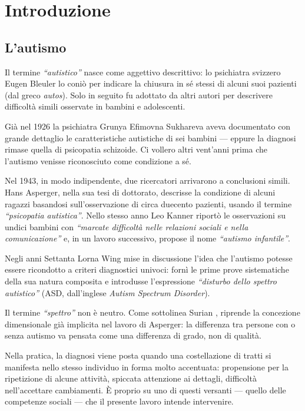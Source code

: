 \documentclass[12pt]{report}
\begin{document}
\chapter{Introduzione}
\label{cap:introduzione}

\section{L'autismo}
Il termine \textit{``autistico''} nasce come aggettivo descrittivo: lo psichiatra svizzero Eugen Bleuler lo coniò per indicare la chiusura in sé stessi di alcuni suoi pazienti (dal greco \textit{autos}). Solo in seguito fu adottato da altri autori per descrivere difficoltà simili osservate in bambini e adolescenti.

Già nel 1926 la psichiatra Grunya Efimovna Sukhareva aveva documentato con grande dettaglio le caratteristiche autistiche di sei bambini --- eppure la diagnosi rimase quella di psicopatia schizoide. Ci vollero altri vent'anni prima che l'autismo venisse riconosciuto come condizione a sé.

Nel 1943, in modo indipendente, due ricercatori arrivarono a conclusioni simili. Hans Asperger, nella sua tesi di dottorato, descrisse la condizione di alcuni ragazzi basandosi sull'osservazione di circa duecento pazienti, usando il termine \textit{``psicopatia autistica''}. Nello stesso anno Leo Kanner riportò le osservazioni su undici bambini con \textit{``marcate difficoltà nelle relazioni sociali e nella comunicazione''} e, in un lavoro successivo, propose il nome \textit{``autismo infantile''}.

Negli anni Settanta Lorna Wing mise in discussione l'idea che l'autismo potesse essere ricondotto a criteri diagnostici univoci: fornì le prime prove sistematiche della sua natura composita e introdusse l'espressione \textit{``disturbo dello spettro autistico''} (ASD, dall'inglese \textit{Autism Spectrum Disorder}).

Il termine \textit{``spettro''} non è neutro. Come sottolinea Surian \cite{surian2021}, riprende la concezione dimensionale già implicita nel lavoro di Asperger: la differenza tra persone con o senza autismo va pensata come una differenza di grado, non di qualità.

Nella pratica, la diagnosi viene posta quando una costellazione di tratti si manifesta nello stesso individuo in forma molto accentuata: propensione per la ripetizione di alcune attività, spiccata attenzione ai dettagli, difficoltà nell'accettare cambiamenti. È proprio su uno di questi versanti --- quello delle competenze sociali --- che il presente lavoro intende intervenire.
\end{document}
